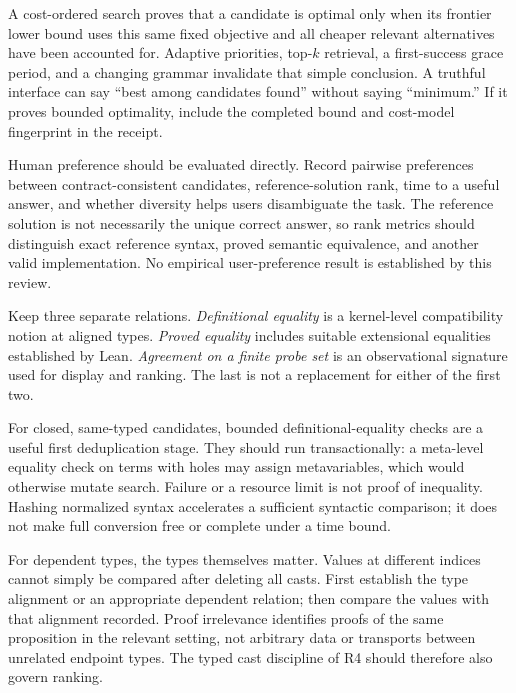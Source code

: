 A cost-ordered search proves that a candidate is optimal only when its frontier lower bound uses this same fixed objective and all cheaper relevant alternatives have been accounted for. Adaptive priorities, top-$k$ retrieval, a first-success grace period, and a changing grammar invalidate that simple conclusion. A truthful interface can say ``best among candidates found'' without saying ``minimum.'' If it proves bounded optimality, include the completed bound and cost-model fingerprint in the receipt.

Human preference should be evaluated directly. Record pairwise preferences between contract-consistent candidates, reference-solution rank, time to a useful answer, and whether diversity helps users disambiguate the task. The reference solution is not necessarily the unique correct answer, so rank metrics should distinguish exact reference syntax, proved semantic equivalence, and another valid implementation. No empirical user-preference result is established by this review.


\answer Keep three separate relations. \emph{Definitional equality} is a kernel-level compatibility notion at aligned types. \emph{Proved equality} includes suitable extensional equalities established by Lean. \emph{Agreement on a finite probe set} is an observational signature used for display and ranking. The last is not a replacement for either of the first two.

For closed, same-typed candidates, bounded definitional-equality checks are a useful first deduplication stage. They should run transactionally: a meta-level equality check on terms with holes may assign metavariables, which would otherwise mutate search. Failure or a resource limit is not proof of inequality. Hashing normalized syntax accelerates a sufficient syntactic comparison; it does not make full conversion free or complete under a time bound.

For dependent types, the types themselves matter. Values at different indices cannot simply be compared after deleting all casts. First establish the type alignment or an appropriate dependent relation; then compare the values with that alignment recorded. Proof irrelevance identifies proofs of the same proposition in the relevant setting, not arbitrary data or transports between unrelated endpoint types. The typed cast discipline of R4 should therefore also govern ranking.

